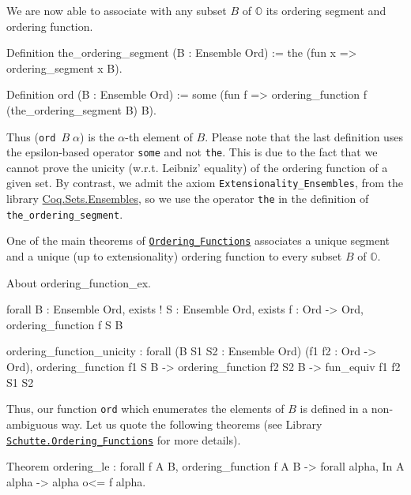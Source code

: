 {We are now able to associate with any subset $B$ of $\mathbb{O}$ its ordering segment and ordering function.

\begin{Coqsrc}
Definition the_ordering_segment (B : Ensemble Ord) :=
  the  (fun x => ordering_segment x B).

Definition ord  (B : Ensemble Ord) := 
  some (fun f => ordering_function f (the_ordering_segment B) B).
\end{Coqsrc}

Thus (\texttt{ord $B \;\alpha$}) is the $\alpha$-th element of $B$.
Please note that the last definition uses the epsilon-based operator \texttt{some} and
not \texttt{the}. This is due to the fact that we cannot prove the unicity (w.r.t. Leibniz' equality) of the ordering function of a given set. 
By contrast, we admit the axiom  \texttt{Extensionality\_Ensembles}, from the library 
\href{https://coq.inria.fr/distrib/current/stdlib/Coq.Sets.Ensembles.html}{Coq.Sets.Ensembles}, so we use the operator \texttt{the} in the definition of
\texttt{the\_ordering\_segment}.

One of the main theorems of
\href{../src/html/hydras.Schutte.Ordering_Functions.html\#ordering_function_ex}%
{\texttt{Ordering\_Functions}} 
associates a unique segment and a unique (up to extensionality) ordering function to every subset $B$ of $\mathbb{O}$.

\begin{Coqsrc}
About ordering_function_ex.
\end{Coqsrc}

\begin{Coqanswer}
forall B : Ensemble Ord,
 exists ! S : Ensemble Ord, 
      exists f : Ord -> Ord, ordering_function f S B
\end{Coqanswer}


\begin{Coqanswer}
ordering_function_unicity :
forall (B S1 S2 : Ensemble Ord) (f1 f2 : Ord -> Ord),
ordering_function f1 S B ->
ordering_function f2 S2 B -> 
fun_equiv f1 f2 S1 S2
\end{Coqanswer}

Thus,  our function \texttt{ord}  which enumerates the elements of $B$ is defined in a non-ambiguous way.
Let us quote the following theorems (see Library
\href{../src/html/hydras.Schutte.Ordering_Functions.html}%
{\texttt{Schutte.Ordering\_Functions}} for more details).
 

\begin{Coqsrc}
Theorem ordering_le : forall f A B,
    ordering_function f A B ->
    forall alpha, In A alpha -> alpha  o<= f alpha.


\end{Coqsrc}}
